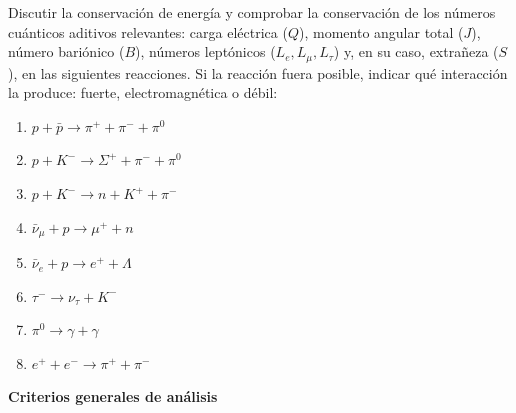 \newpage
\begin{problema}
Discutir la conservación de energía y comprobar la conservación de los números cuánticos aditivos relevantes: carga eléctrica ($Q$), momento angular total ($J$), número bariónico ($B$), números leptónicos ($L_e, L_\mu, L_\tau$) y, en su caso, extrañeza ($S$), en las siguientes reacciones. Si la reacción fuera posible, indicar qué interacción la produce: fuerte, electromagnética o débil:
\begin{enumerate}[label=\alph*)]
    \item $p + \bar{p} \to \pi^+ + \pi^- + \pi^0$
    \item $p + K^- \to \Sigma^+ + \pi^- + \pi^0$
    \item $p + K^- \to n + K^+ + \pi^-$
    \item $\bar{\nu}_\mu + p \to \mu^+ + n$
    \item $\bar{\nu}_e + p \to e^+ + \Lambda$
    \item $\tau^- \to \nu_\tau + K^-$
    \item $\pi^0 \to \gamma + \gamma$
    \item $e^+ + e^- \to \pi^+ + \pi^-$
\end{enumerate}
\tcblower
\textbf{Criterios generales de análisis}


\end{problema}
